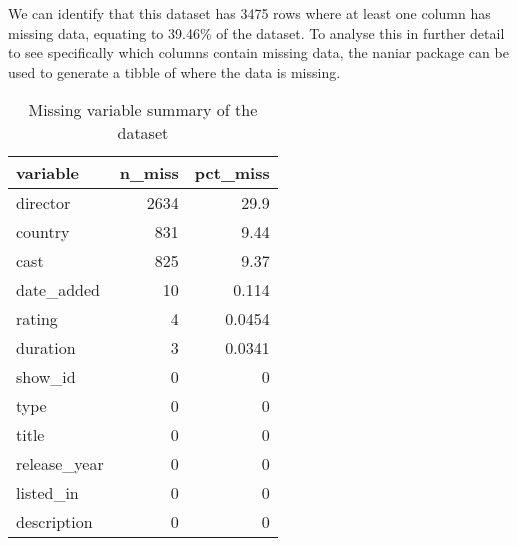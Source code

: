 \documentclass[12pt]{report}\usepackage[]{graphicx}\usepackage[]{xcolor}
\newenvironment{knitrout}{}{} %
\begin{document}
    We can identify that this dataset has 3475 rows where at least one column has missing data, equating to 
    39.46\% of the dataset. To analyse this in further detail to see specifically which columns contain
    missing data, the naniar package can be used to generate a tibble of where the data is missing.

\begin{knitrout}
\color{fgcolor}\begin{table}[H]
\centering
\caption{\label{tab:unnamed-chunk-2}Missing variable summary of the dataset}
\centering
\begin{tabular}[t]{l|r|r}
\hline
variable & n\_miss & pct\_miss\\
\hline
director & 2634 & 29.9\\
\hline
country & 831 & 9.44\\
\hline
cast & 825 & 9.37\\
\hline
date\_added & 10 & 0.114\\
\hline
rating & 4 & 0.0454\\
\hline
duration & 3 & 0.0341\\
\hline
show\_id & 0 & 0\\
\hline
type & 0 & 0\\
\hline
title & 0 & 0\\
\hline
release\_year & 0 & 0\\
\hline
listed\_in & 0 & 0\\
\hline
description & 0 & 0\\
\hline
\end{tabular}
\end{table}

\end{knitrout}

    
\end{document}
